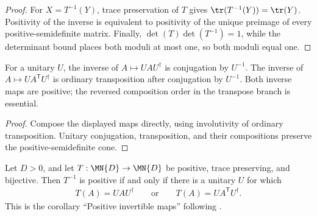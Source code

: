 \begin{proof}\leanok
    For $X=T^{-1}(Y)$, trace preservation of $T$ gives
    $\tr(T^{-1}(Y))=\tr(Y)$.  Positivity of the inverse is equivalent to
    positivity of the unique preimage of every positive-semidefinite matrix.
    Finally,
    $\det(T)\det(T^{-1})=1$, while the determinant bound places both moduli
    at most one, so both moduli equal one.
\end{proof}

\begin{theorem}
    \label{thm:positive_inverse_standard_forms}
    \leanok
    For a unitary $U$, the inverse of $A\mapsto UAU^\dagger$ is conjugation
    by $U^{-1}$.  The inverse of
    $A\mapsto UA^{\mathsf T}U^\dagger$ is ordinary transposition after
    conjugation by $U^{-1}$.  Both inverse maps are positive; the reversed
    composition order in the transpose branch is essential.
\end{theorem}

\begin{proof}\leanok
    Compose the displayed maps directly, using involutivity of ordinary
    transposition.  Unitary conjugation, transposition, and their compositions
    preserve the positive-semidefinite cone.
\end{proof}

\begin{theorem}
    \label{thm:wolf_positive_invertible_maps}
    \leanok
    Let $D>0$, and let $T:\MN{D}\to\MN{D}$ be positive, trace preserving,
    and bijective.  Then $T^{-1}$ is positive if and only if there is a
    unitary $U$ for which
    \begin{align}
        T(A)=UAU^\dagger
        \qquad\text{or}\qquad
        T(A)=UA^{\mathsf T}U^\dagger.
    \end{align}
    This is the corollary ``Positive invertible maps'' following
    \cite[Theorem~6.1]{Wolf2012Quantum}.
\end{theorem}

